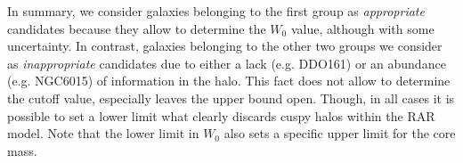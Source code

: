 In summary, we consider galaxies belonging to the first group as \textit{appropriate} candidates because they allow to determine the $W_0$ value, although with some uncertainty. In contrast, galaxies belonging to the other two groups we consider as \textit{inappropriate} candidates due to either a lack (e.g. DDO161) or an abundance (e.g. NGC6015) of information in the halo. This fact does not allow to determine the cutoff value, especially leaves the upper bound open. Though, in all cases it is possible to set a lower limit what clearly discards cuspy halos within the RAR model. Note that the lower limit in $W_0$ also sets a specific upper limit for the core mass.

